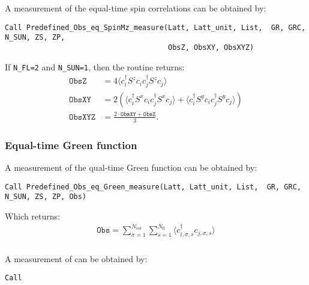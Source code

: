 A measurement of the equal-time spin correlations can be obtained by:

\begin{lstlisting}[style=fortran]
Call Predefined_Obs_eq_SpinMz_measure(Latt, Latt_unit, List,  GR, GRC, N_SUN, ZS, ZP,
                                      ObsZ, ObsXY, ObsXYZ)
\end{lstlisting}

If \texttt{N\_FL=2} and \texttt{N\_SUN=1}, then the routine returns:
\begin{align}
\texttt{ObsZ}   &=  4 \langle c^{\dagger}_i S^z c_i  c^{\dagger}_j S^z  c_j\rangle \\  
\texttt{ObsXY}  &=  2 \left( \langle c^{\dagger}_i S^x c_i  c^{\dagger}_j S^x  c_j\rangle  +   \langle c^{\dagger}_i S^y c_i  c^{\dagger}_j S^y  c_j\rangle \right)\\
\texttt{ObsXYZ} &=  \frac{2\cdot\texttt{ObsXY} + \texttt{ObsZ}}{3}.
\end{align}


\subsubsection{Equal-time Green function}

A measurement of the qual-time Green function can be obtained by:

\begin{lstlisting}[style=fortran]
Call Predefined_Obs_eq_Green_measure(Latt, Latt_unit, List,  GR, GRC, N_SUN, ZS, ZP, Obs)
\end{lstlisting}

Which returns:
\begin{align}
\texttt{Obs} = \sum_{\sigma=1}^{N_\text{col}} \sum_{s=1}^{N_\text{fl}} \langle  c^{\dagger}_{i,\sigma,s} c_{j,\sigma,s} \rangle
\end{align}


\subsubsection{}

A measurement of  can be obtained by:

\begin{lstlisting}[style=fortran]
Call 
\end{lstlisting}

\subsubsection{}

